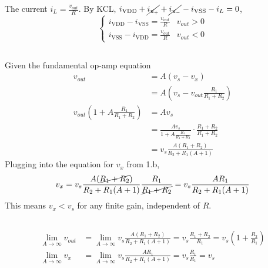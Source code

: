 \documentclass[]{article}
\begin{document}
The current \(i_L = \frac{v_{out}}{R}\). 
By KCL, \(i_{\mathrm{VDD}} + \cancel{i_{u_+}} + \cancel{i_{u_-}} - i_{\mathrm{VSS}} - i_L = 0\), 
\begin{equation}
	\begin{cases}
	i_{\mathrm{VDD}} - i_{\mathrm{VSS}} = \frac{v_{out}}{R} & v_{out} > 0 \\
	i_{\mathrm{VSS}} - i_{\mathrm{VDD}} = \frac{v_{out}}{R} & v_{out} < 0
	\end{cases}
\end{equation}

\subsection{}

Given the fundamental op-amp equation
\begin{align}
	v_{out} &= A (v_s - v_x) \\
	&= A \left(v_s - v_{out} \frac{R_1}{R_1 + R_2}\right) \\
	v_{out} \left(1 + A \frac{R_1}{R_1 + R_2}\right) &= A v_s \\
	&= \frac{A v_s}{1 + A \frac{R_1}{R_1 + R_2}} \cdot \frac{R_1 + R_2}{R_1 + R_2} \\
	&= v_s \frac{A (R_1 + R_2)}{R_2 + R_1(A + 1)}
\end{align}
Plugging into the equation for \(v_x\) from 1.b, 
\begin{equation}
	v_x = v_s \frac{A (\cancel{R_1 + R_2})}{R_2 + R_1(A + 1)} \frac{R_1}{\cancel{R_1 + R_2}} = v_s \frac{AR_1}{R_2 + R_1 (A + 1)}
\end{equation}
This means \(v_x < v_s\) for any finite gain, independent of \(R\). 

\subsection{}

\begin{align}
	\lim_{A \to \infty} v_{out} &= \lim_{A \to \infty} v_s \frac{A (R_1 + R_2)}{R_2 + R_1(A + 1)} = v_s \frac{R_1 + R_2}{R_1} = v_s \left(1 + \frac{R_2}{R_1}\right) \\
	\lim_{A \to \infty} v_x &= \lim_{A \to \infty} v_s \frac{AR_1}{R_2 + R_1 (A + 1)} = v_s \frac{R_1}{R_1} = v_s
\end{align}

\subsection{}
\end{document}
